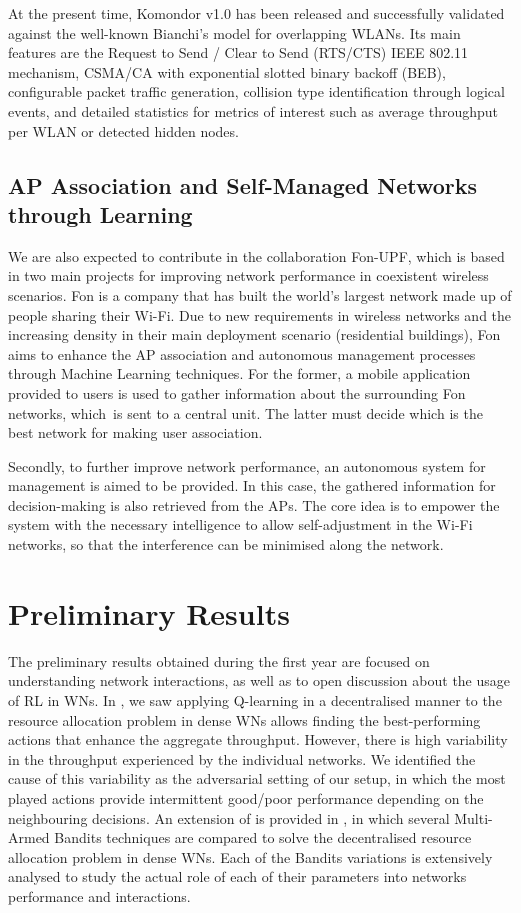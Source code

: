\documentclass[12pt, a4paper,twoside]{tesi_upf}
\begin{document}
				At the present time, Komondor v1.0 has been released and successfully validated against the well-known Bianchi's model for overlapping WLANs. Its main features are the Request to Send / Clear to Send (RTS/CTS) IEEE 802.11 mechanism, CSMA/CA with exponential slotted binary backoff (BEB), configurable packet traffic generation, collision type identification through logical events, and detailed statistics for metrics of interest such as average throughput per WLAN or detected hidden nodes. 			
				
			\subsection{AP Association and Self-Managed Networks through Learning}
			\label{section:fon_project}	
				We are also expected to contribute in the collaboration Fon-UPF, which is based in two main projects for improving network performance in coexistent wireless scenarios. Fon is a company that has built the world's largest network made up of people sharing their Wi-Fi. Due to new requirements in wireless networks and the increasing density in their main deployment scenario (residential buildings), Fon aims to enhance the AP association and autonomous management processes through Machine Learning techniques. For the former, a mobile application provided to users is used to gather information about the surrounding Fon networks, which is sent to a central unit. The latter must decide which is the best network for making user association.
				
				Secondly, to further improve network performance, an autonomous system for management is aimed to be provided. In this case, the gathered information for decision-making is also retrieved from the APs. The core idea is to empower the system with the necessary intelligence to allow self-adjustment in the Wi-Fi networks, so that the interference can be minimised along the network.
			
		\section{Preliminary Results}
		\label{section:preliminary_results}	
			The preliminary results obtained during the first year are focused on understanding network interactions, as well as to open discussion about the usage of RL in WNs. In \cite{wilhelmi2017implications}, we saw applying Q-learning in a decentralised manner to the resource allocation problem in dense WNs allows finding the best-performing actions that enhance the aggregate throughput. However, there is high variability in the throughput experienced by the individual networks. We identified the cause of this variability as the adversarial setting of our setup, in which the most played actions provide intermittent good/poor performance depending on the neighbouring decisions. An extension of \cite{wilhelmi2017implications} is provided in \cite{wilhelmi2017enhancing}, in which several Multi-Armed Bandits techniques are compared to solve the decentralised resource allocation problem in dense WNs. Each of the Bandits variations is extensively analysed to study the actual role of each of their parameters into networks performance and interactions.
\end{document}
